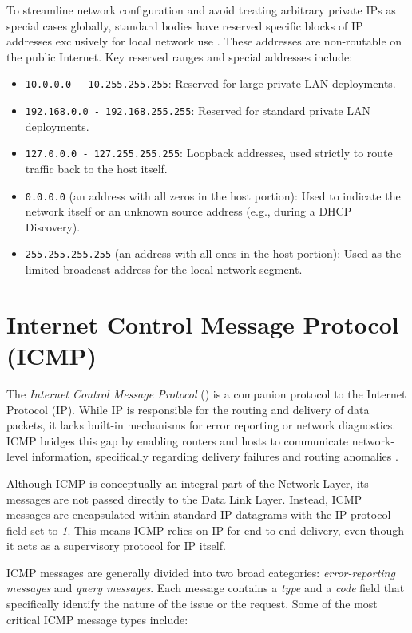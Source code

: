 To streamline network configuration and avoid treating arbitrary private IPs as special cases globally, standard bodies have reserved specific blocks of IP addresses exclusively for local network use \cite{rfc1918}. These addresses are non-routable on the public Internet. Key reserved ranges and special addresses include:
\begin{itemize}
    \item \texttt{10.0.0.0 - 10.255.255.255}: Reserved for large private LAN deployments.
    \item \texttt{192.168.0.0 - 192.168.255.255}: Reserved for standard private LAN deployments.
    \item \texttt{127.0.0.0 - 127.255.255.255}: Loopback addresses, used strictly to route traffic back to the host itself.
    \item \texttt{0.0.0.0} (an address with all zeros in the host portion): Used to indicate the network itself or an unknown source address (e.g., during a DHCP Discovery).
    \item \texttt{255.255.255.255} (an address with all ones in the host portion): Used as the limited broadcast address for the local network segment.
\end{itemize}

\section{Internet Control Message Protocol (ICMP)}
The \emph{Internet Control Message Protocol} () is a companion protocol to the Internet Protocol (IP). 
While IP is responsible for the routing and delivery of data packets, it lacks built-in mechanisms for error reporting or network diagnostics. 
ICMP bridges this gap by enabling routers and hosts to communicate network-level information, specifically regarding delivery failures and routing anomalies \cite{rfc792}.

Although ICMP is conceptually an integral part of the Network Layer, its messages are not passed directly to the Data Link Layer. 
Instead, ICMP messages are encapsulated within standard IP datagrams with the IP protocol field set to \emph{1}. 
This means ICMP relies on IP for end-to-end delivery, even though it acts as a supervisory protocol for IP itself.

ICMP messages are generally divided into two broad categories: \emph{error-reporting messages} and \emph{query messages}. Each message contains a \emph{type} and a \emph{code} field that specifically identify the nature of the issue or the request. 
Some of the most critical ICMP message types include:

